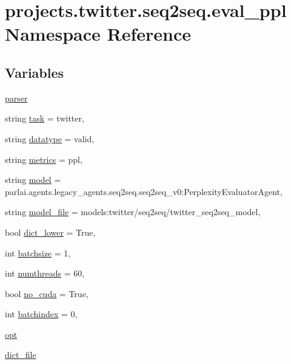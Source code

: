 \hypertarget{namespaceprojects_1_1twitter_1_1seq2seq_1_1eval__ppl}{}\section{projects.\+twitter.\+seq2seq.\+eval\+\_\+ppl Namespace Reference}
\label{namespaceprojects_1_1twitter_1_1seq2seq_1_1eval__ppl}
\subsection*{Variables}
\begin{DoxyCompactItemize}
\item 
\hyperlink{namespaceprojects_1_1twitter_1_1seq2seq_1_1eval__ppl_a58de09ffe0e977c1b7e34dde79ea71ce}{parser}
\item 
string \hyperlink{namespaceprojects_1_1twitter_1_1seq2seq_1_1eval__ppl_a0bf742f6d4a475b47c889b9e98b06614}{task} = \textquotesingle{}twitter\textquotesingle{},
\item 
string \hyperlink{namespaceprojects_1_1twitter_1_1seq2seq_1_1eval__ppl_aacc5fd9c69366bf776fad765b5d251d4}{datatype} = \textquotesingle{}valid\textquotesingle{},
\item 
string \hyperlink{namespaceprojects_1_1twitter_1_1seq2seq_1_1eval__ppl_ad7b62ca13d92e790d0afb4636135c05b}{metrics} = \textquotesingle{}ppl\textquotesingle{},
\item 
string \hyperlink{namespaceprojects_1_1twitter_1_1seq2seq_1_1eval__ppl_a984f61d6d8edf77f19f9261c674a6c14}{model} = \textquotesingle{}parlai.\+agents.\+legacy\+\_\+agents.\+seq2seq.\+seq2seq\+\_\+v0\+:\+Perplexity\+Evaluator\+Agent\textquotesingle{},
\item 
string \hyperlink{namespaceprojects_1_1twitter_1_1seq2seq_1_1eval__ppl_ae1a5a7b1b8b3446362599b5b30716865}{model\+\_\+file} = \textquotesingle{}models\+:twitter/seq2seq/twitter\+\_\+seq2seq\+\_\+model\textquotesingle{},
\item 
bool \hyperlink{namespaceprojects_1_1twitter_1_1seq2seq_1_1eval__ppl_aa40b356c39461d656ef4aaacebbd6b01}{dict\+\_\+lower} = True,
\item 
int \hyperlink{namespaceprojects_1_1twitter_1_1seq2seq_1_1eval__ppl_adf0dd5ffb5364eadd70f0b035bfad46e}{batchsize} = 1,
\item 
int \hyperlink{namespaceprojects_1_1twitter_1_1seq2seq_1_1eval__ppl_a79276119e8d4573a478306054119c580}{numthreads} = 60,
\item 
bool \hyperlink{namespaceprojects_1_1twitter_1_1seq2seq_1_1eval__ppl_ab7339770f0b9fd5733718fa73bfbe5f9}{no\+\_\+cuda} = True,
\item 
int \hyperlink{namespaceprojects_1_1twitter_1_1seq2seq_1_1eval__ppl_a605b0cb0513d1064f996cd9b5a8a3f1f}{batchindex} = 0,
\item 
\hyperlink{namespaceprojects_1_1twitter_1_1seq2seq_1_1eval__ppl_a94d21f9fb493bc113066eb0fb91ef244}{opt}
\item 
\hyperlink{namespaceprojects_1_1twitter_1_1seq2seq_1_1eval__ppl_aeb65d54dbb519e3f783fca6b64f5a28c}{dict\+\_\+file}
\end{DoxyCompactItemize}


